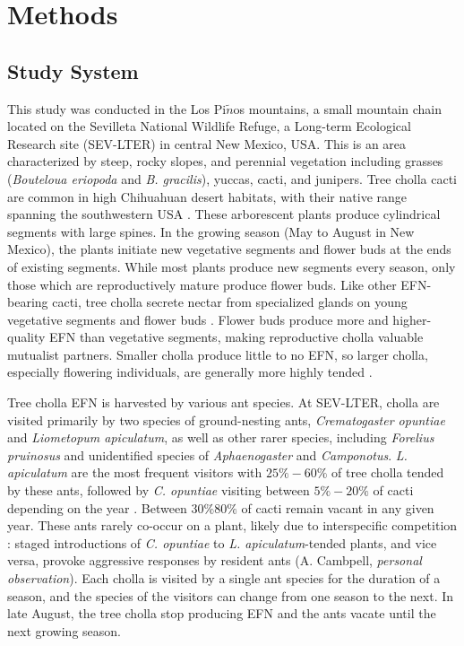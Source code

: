 \documentclass[11pt]{article}
\begin{document}
\section*{Methods}
\subsection*{Study System}
  
This study was conducted in the Los Pi$\tilde{n}$os mountains, a small mountain chain located on the Sevilleta National Wildlife Refuge, a Long-term Ecological Research site (SEV-LTER) in central New Mexico, USA.
This is an area characterized by steep, rocky slopes, and perennial vegetation including grasses (\textit{Bouteloua eriopoda} and \textit{B. gracilis}), yuccas, cacti, and junipers. 
Tree cholla cacti are common in high Chihuahuan desert habitats, with their native range spanning the southwestern USA \citep{Benson1982}. 
These arborescent plants produce cylindrical segments with large spines. 
In the growing season (May to August in New Mexico), the plants initiate new vegetative segments and flower buds at the ends of existing segments. 
While most plants produce new segments every season, only those which are reproductively mature produce flower buds. 
Like other EFN-bearing cacti, tree cholla secrete nectar from specialized glands on young vegetative segments and flower buds \citep{Ness2006,Oliveira1999}. 
Flower buds produce more and higher-quality EFN than vegetative segments, making reproductive cholla valuable mutualist partners. 
Smaller cholla produce little to no EFN, so larger cholla, especially flowering individuals, are generally more highly tended \citep{Miller2014}. 

Tree cholla EFN is harvested by various ant species. 
At SEV-LTER, cholla are visited primarily by two species of ground-nesting ants, \textit{Crematogaster opuntiae} and \textit{Liometopum apiculatum}, as well as other rarer species, including \textit{Forelius pruinosus} and unidentified species of \textit{Aphaenogaster} and \textit{Camponotus}.
\textit{L. apiculatum} are the most frequent visitors with $25\% - 60\%$ of tree cholla tended by these ants, followed by \textit{C. opuntiae} visiting between $5\% - 20\%$ of cacti depending on the year \citep{Donald2022}. 
Between $ 30\% 80\%$ of cacti remain vacant in any given year. 
These ants rarely co-occur on a plant, likely due to interspecific competition \citep{Miller2007}: staged introductions of \textit{C. opuntiae} to \textit{L. apiculatum}-tended plants, and vice versa, provoke aggressive responses by resident ants (A. Cambpell, \textit{personal observation}).
Each cholla is visited by a single ant species for the duration of a season, and the species of the visitors can change from one season to the next. 
In late August, the tree cholla stop producing EFN and the ants vacate until the next growing season. 
\end{document}
